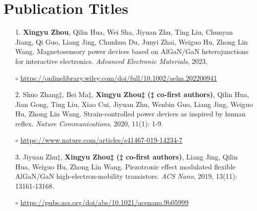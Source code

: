 \chapter{Publication Titles}
\label{ap:Publication Titles}
\ifpdf
    \graphicspath{{Appendix1/Figs/Raster/}{Appendix1/Figs/PDF/}{Appendix1/Figs/}}
\else
    \graphicspath{{Appendix1/Figs/Vector/}{Appendix1/Figs/}}
\fi


\begin{itemize}
	\item [1.] 
	\textbf{Xingyu Zhou}, Qilin Hua, Wei Sha, Jiyuan Zhu, Ting Liu, Chunyan Jiang, Qi Guo, Liang Jing, Chunhua Du, Junyi Zhai, Weiguo Hu, Zhong Lin Wang. Magnetosensory power devices based on AlGaN/GaN heterojunctions for interactive electronics. \textit{Advanced Electronic Materials}, 2023, 
	
	\textcolor{blue}{$\circ$} \url{https://onlinelibrary.wiley.com/doi/full/10.1002/aelm.202200941}

	\item [2.] 
	Shuo Zhang‡, Bei Ma‡, \textbf{Xingyu Zhou‡ (‡ co-first authors)}, Qilin Hua, Jian Gong, Ting Liu, Xiao Cui, Jiyuan Zhu, Wenbin Guo, Liang Jing, Weiguo Hu, Zhong Lin Wang. Strain-controlled power devices as inspired by human reflex. \textit{Nature Communications}, 2020, 11(1): 1-9.
	
	\textcolor{blue}{$\circ$} \url{https://www.nature.com/articles/s41467-019-14234-7}
	
	\item [3.] 
	Jiyuan Zhu‡, \textbf{Xingyu Zhou‡ (‡ co-first authors)}, Liang Jing, Qilin Hua, Weiguo Hu, Zhong Lin Wang. Piezotronic effect modulated flexible AlGaN/GaN high-electron-mobility transistors. \textit{ACS Nano}, 2019, 13(11): 13161-13168.
	
	\textcolor{blue}{$\circ$} \url{https://pubs.acs.org/doi/abs/10.1021/acsnano.9b05999}
\end{itemize}







